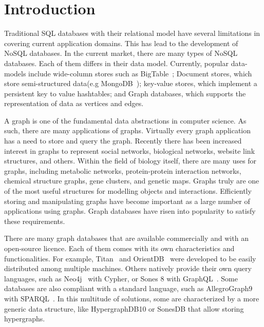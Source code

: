 \section{Introduction}

Traditional SQL databases with their relational model have several limitations in covering current application domains. This has lead to the development of NoSQL databases. In the current market, there are many types of NoSQL databases. Each of them differs in their data model. Currently, popular data-models include wide-column stores such as BigTable~\cite{chang2008bigtable}; Document stores, which store semi-structured data(e.g MongoDB~\cite{chodorow2013mongodb}); key-value stores, which implement a persistent key to value hashtables; and Graph databases, which supports the representation of data as vertices and edges.

A graph is one of the fundamental data abstractions in computer science. As such, there are many applications of graphs. Virtually every graph application has a need to store and query the graph. Recently there has been increased interest in graphs to represent social networks, biological networks, website link structures, and others. Within the field of biology itself, there are many uses for graphs, including metabolic networks, protein-protein interaction networks, chemical structure graphs, gene clusters, and genetic maps. Graphs truly are one of the most useful structures for modelling objects and interactions. Efficiently storing and manipulating graphs have become important as a large number of applications using graphs. Graph databases have risen into popularity to satisfy these requirements.

There are many graph databases that are available commercially and with an open-source licence. Each of them comes with its own characteristics and functionalities. For example, Titan~\cite{jouili2013empirical} and OrientDB~\cite{tesoriero2013getting} were developed to be easily distributed among multiple machines. Others natively provide their own query languages, such as Neo4j~\cite{holzschuher2013performance} with Cypher, or Sones 8 with GraphQL~\cite{vazquez2017improving}. Some databases are also compliant with a standard language, such as AllegroGraph9~\cite{abburu2013format} with SPARQL~\cite{abburu2013format}. In this multitude of solutions, some are characterized by a more generic data structure, like HypergraphDB10 or SonesDB that allow storing hypergraphs. 

